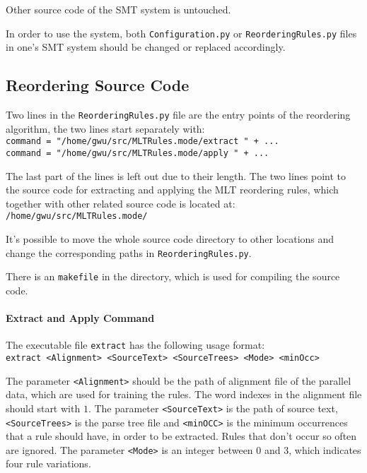 Other source code of the SMT system is untouched.

In order to use the system, both \verb|Configuration.py| or \verb|ReorderingRules.py| files in one's SMT system should be changed or replaced accordingly.

\subsection{Reordering Source Code}

Two lines in the \verb|ReorderingRules.py| file are the entry points of the reordering algorithm, the two lines start separately with:\\
\verb|command = "/home/gwu/src/MLTRules.mode/extract " + ...|\\
\verb|command = "/home/gwu/src/MLTRules.mode/apply " + ...|

The last part of the lines is left out due to their length. The two lines point to the source code for extracting and applying the MLT reordering rules, which together with other related source code is located at:\\
\verb|/home/gwu/src/MLTRules.mode/|

It's possible to move the whole source code directory to other locations and change the corresponding paths in \verb|ReorderingRules.py|.

There is an \verb|makefile| in the directory, which is used for compiling the source code.

\paragraph{Extract and Apply Command}

The executable file \verb|extract| has the following usage format:\\ \verb|extract <Alignment> <SourceText> <SourceTrees> <Mode> <minOcc>|

The parameter \verb|<Alignment>| should be the path of alignment file of the parallel data, which are used for training the rules. The word indexes in the alignment file should start with $1$. The parameter \verb|<SourceText>| is the path of source text, \verb|<SourceTrees>| is the parse tree file and \verb|<minOCC>| is the minimum occurrences that a rule should have, in order to be extracted. Rules that don't occur so often are ignored. The parameter \verb|<Mode>| is an integer between $0$ and $3$, which indicates four rule variations.


